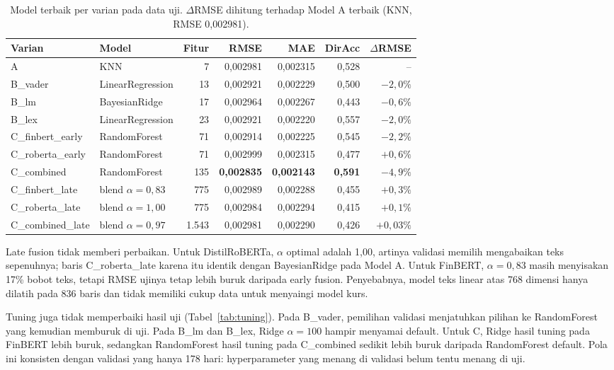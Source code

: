 \documentclass[10pt,a4paper]{article}
\begin{document}
\begin{table}[h]
\centering\small
\caption{Model terbaik per varian pada data uji. \(\Delta\)RMSE dihitung terhadap Model A terbaik (KNN, RMSE 0,002981).}
\label{tab:ablasi}
\footnotesize
\setlength{\tabcolsep}{4pt}
\begin{tabular}{llrrrrr}
\toprule
Varian & Model & Fitur & RMSE & MAE & DirAcc & \(\Delta\)RMSE \\
\midrule
A & KNN & 7 & 0,002981 & 0,002315 & 0,528 & -- \\
B\_vader & LinearRegression & 13 & 0,002921 & 0,002229 & 0,500 & \(-2,0\%\) \\
B\_lm & BayesianRidge & 17 & 0,002964 & 0,002267 & 0,443 & \(-0,6\%\) \\
B\_lex & LinearRegression & 23 & 0,002921 & 0,002220 & 0,557 & \(-2,0\%\) \\
C\_finbert\_early & RandomForest & 71 & 0,002914 & 0,002225 & 0,545 & \(-2,2\%\) \\
C\_roberta\_early & RandomForest & 71 & 0,002999 & 0,002315 & 0,477 & \(+0,6\%\) \\
C\_combined & RandomForest & 135 & \textbf{0,002835} & \textbf{0,002143} & \textbf{0,591} & \(-4,9\%\) \\
C\_finbert\_late & blend \(\alpha=0{,}83\) & 775 & 0,002989 & 0,002288 & 0,455 & \(+0,3\%\) \\
C\_roberta\_late & blend \(\alpha=1{,}00\) & 775 & 0,002984 & 0,002294 & 0,415 & \(+0,1\%\) \\
C\_combined\_late & blend \(\alpha=0{,}97\) & 1.543 & 0,002981 & 0,002290 & 0,426 & \(+0,03\%\) \\
\bottomrule
\end{tabular}
\end{table}

Late fusion tidak memberi perbaikan. Untuk DistilRoBERTa, \(\alpha\) optimal adalah 1,00, artinya validasi memilih mengabaikan teks sepenuhnya; baris C\_roberta\_late karena itu identik dengan BayesianRidge pada Model A. Untuk FinBERT, \(\alpha=0{,}83\) masih menyisakan 17\% bobot teks, tetapi RMSE ujinya tetap lebih buruk daripada early fusion. Penyebabnya, model teks linear atas 768 dimensi hanya dilatih pada 836 baris dan tidak memiliki cukup data untuk menyaingi model kurs.

Tuning juga tidak memperbaiki hasil uji (Tabel~\ref{tab:tuning}). Pada B\_vader, pemilihan validasi menjatuhkan pilihan ke RandomForest yang kemudian memburuk di uji. Pada B\_lm dan B\_lex, Ridge \(\alpha=100\) hampir menyamai default. Untuk C, Ridge hasil tuning pada FinBERT lebih buruk, sedangkan RandomForest hasil tuning pada C\_combined sedikit lebih buruk daripada RandomForest default. Pola ini konsisten dengan validasi yang hanya 178 hari: hyperparameter yang menang di validasi belum tentu menang di uji.
\end{document}
